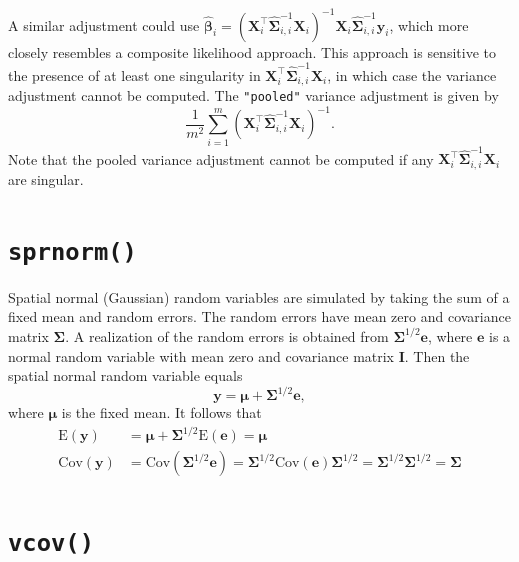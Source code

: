 \documentclass[10pt,letterpaper]{article}
\begin{document}
A similar adjustment could use
\(\boldsymbol{\hat{\beta}}_i = (\mathbf{X}_i^\top \hat{\boldsymbol{\Sigma}}^{-1}_{i, i} \mathbf{X}_i)^{-1}\mathbf{X}_i \hat{\boldsymbol{\Sigma}}^{-1}_{i, i} \mathbf{y}_i\),
which more closely resembles a composite likelihood approach. This
approach is sensitive to the presence of at least one singularity in
\(\mathbf{X}_i^\top \hat{\boldsymbol{\Sigma}}^{-1}_{i, i} \mathbf{X}_i\),
in which case the variance adjustment cannot be computed. The
\texttt{"pooled"} variance adjustment is given by \begin{equation*}
\frac{1}{m^2} \sum_{i = 1}^m (\mathbf{X}^\top_i \hat{\boldsymbol{\Sigma}}^{-1}_{i, i} \mathbf{X}_i)^{-1}.
\end{equation*} Note that the pooled variance adjustment cannot be
computed if any
\(\mathbf{X}_i^\top \hat{\boldsymbol{\Sigma}}^{-1}_{i, i} \mathbf{X}_i\)
are singular.

\hypertarget{sec:sprnorm}{%
\section{\texorpdfstring{\texttt{sprnorm()}}{sprnorm()}}\label{sec:sprnorm}}

Spatial normal (Gaussian) random variables are simulated by taking the
sum of a fixed mean and random errors. The random errors have mean zero
and covariance matrix \(\boldsymbol{\Sigma}\). A realization of the
random errors is obtained from \(\boldsymbol{\Sigma}^{1/2} \mathbf{e}\),
where \(\mathbf{e}\) is a normal random variable with mean zero and
covariance matrix \(\mathbf{I}\). Then the spatial normal random
variable equals \begin{equation*}
 \mathbf{y} = \boldsymbol{\mu} + \boldsymbol{\Sigma}^{1/2} \mathbf{e},
\end{equation*} where \(\boldsymbol{\mu}\) is the fixed mean. It follows
that \begin{equation*}
  \begin{split}
  \text{E}(\mathbf{y}) & = \boldsymbol{\mu} + \boldsymbol{\Sigma}^{1/2} \text{E}(\mathbf{e}) = \boldsymbol{\mu} \\
  \text{Cov}(\mathbf{y}) & = \text{Cov}(\boldsymbol{\Sigma}^{1/2} \mathbf{e}) = \boldsymbol{\Sigma}^{1/2} \text{Cov}(\mathbf{e}) \boldsymbol{\Sigma}^{1/2} = \boldsymbol{\Sigma}^{1/2} \boldsymbol{\Sigma}^{1/2} = \boldsymbol{\Sigma}
  \end{split}
\end{equation*}

\hypertarget{sec:vcov}{%
\section{\texorpdfstring{\texttt{vcov()}}{vcov()}}\label{sec:vcov}}
\end{document}
